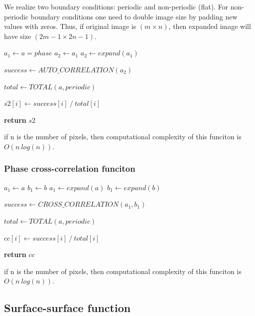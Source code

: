 \documentclass[reprint,amsmath,amssymb,aps,pre]{revtex4-1}
\begin{document}
We realize two boundary conditions: periodic and non-periodic (flat).
For non-periodic boundary conditions one need to double image size
by padding new values with zeros.
Thus, if original image is $(m \times n)$,
then expanded image will have size $(2m - 1 \times 2n - 1)$.

\begin{algorithmic}[1]
    \State $a_1 \gets a = phase$
      \State $a_2 \gets a_1$
    \Else
      \State $a_2 \gets expand(a_1)$
    \EndIf
    
    \State $success \gets AUTO\_CORRELATION(a_2)$

    \State $total \gets TOTAL(a, periodic)$

      \State $s2[i] \gets success[i]\ /\ total[i]$
    \EndFor
    
    \State \textbf{return} $s2$
  \EndProcedure
\end{algorithmic} 

if n is the number of pixels, then computational complexity
of this funciton is $O(n\ log(n))$.

\subsubsection{Phase cross-correlation funciton}

\begin{algorithmic}[1]
      \State $a_1 \gets a$
      \State $b_1 \gets b$
    \Else
      \State $a_1 \gets expand(a)$
      \State $b_1 \gets expand(b)$
    \EndIf
    
    \State $success \gets CROSS\_CORRELATION(a_1, b_1)$

    \State $total \gets TOTAL(a, periodic)$

      \State $cc[i] \gets success[i]\ /\ total[i]$
    \EndFor

    \State \textbf{return} $cc$
  \EndProcedure
\end{algorithmic}

if n is the number of pixels, then computational complexity
of this funciton is $O(n\ log(n))$.

\subsection{Surface-surface function}
\end{document}
